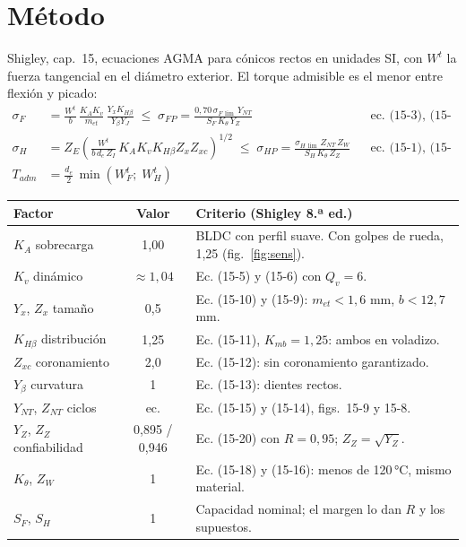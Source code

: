 \documentclass[11pt,a4paper]{article}
\begin{document}
\section{Método}
Shigley, cap.~15, ecuaciones AGMA para cónicos rectos en unidades SI, con $W^t$ la fuerza tangencial en el diámetro exterior.
El torque admisible es el menor entre flexión y picado:
\begin{align}
\sigma_F &= \frac{W^t}{b}\,\frac{K_A K_v}{m_{et}}\,\frac{Y_x K_{H\beta}}{Y_\beta Y_J}
  \;\le\; \sigma_{FP}=\frac{0{,}70\,\sigma_{F\,\lim}\,Y_{NT}}{S_F\,K_\theta\,Y_Z}
  && \text{ec. (15-3), (15-4)}\\
\sigma_H &= Z_E\left(\frac{W^t}{b\,d_e\,Z_I}\,K_A K_v K_{H\beta} Z_x Z_{xc}\right)^{1/2}
  \;\le\; \sigma_{HP}=\frac{\sigma_{H\,\lim}\,Z_{NT}\,Z_W}{S_H\,K_\theta\,Z_Z}
  && \text{ec. (15-1), (15-2)}\\
T_{adm} &= \frac{d_e}{2}\,\min\!\left(W^t_F;\;W^t_H\right)
\end{align}

\begin{table}[H]\centering\small
\begin{tabularx}{\linewidth}{l c X}
\toprule
Factor & Valor & Criterio (Shigley 8.ª ed.)\\\midrule
$K_A$ sobrecarga & 1,00 & BLDC con perfil suave. Con golpes de rueda, 1,25 (fig.~\ref{fig:sens}).\\
$K_v$ dinámico & $\approx1{,}04$ & Ec. (15-5) y (15-6) con $Q_v=6$.\\
$Y_x$, $Z_x$ tamaño & 0,5 & Ec. (15-10) y (15-9): $m_{et}<1{,}6$ mm, $b<12{,}7$ mm.\\
$K_{H\beta}$ distribución & 1,25 & Ec. (15-11), $K_{mb}=1{,}25$: ambos en voladizo.\\
$Z_{xc}$ coronamiento & 2,0 & Ec. (15-12): sin coronamiento garantizado.\\
$Y_\beta$ curvatura & 1 & Ec. (15-13): dientes rectos.\\
$Y_{NT}$, $Z_{NT}$ ciclos & ec. & Ec. (15-15) y (15-14), figs.~15-9 y 15-8.\\
$Y_Z$, $Z_Z$ confiabilidad & 0,895 / 0,946 & Ec. (15-20) con $R=0{,}95$; $Z_Z=\sqrt{Y_Z}$.\\
$K_\theta$, $Z_W$ & 1 & Ec. (15-18) y (15-16): menos de 120\,°C, mismo material.\\
$S_F$, $S_H$ & 1 & Capacidad nominal; el margen lo dan $R$ y los supuestos.\\
\bottomrule
\end{tabularx}
\end{table}
\end{document}
